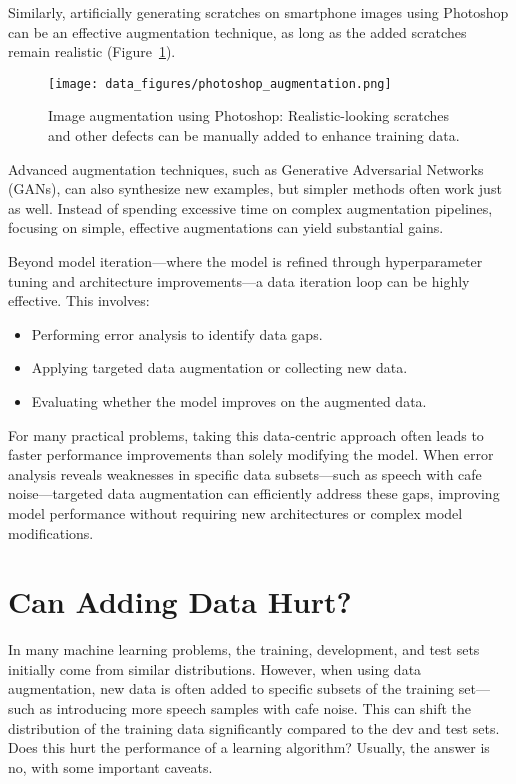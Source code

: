 \documentclass[12pt,openany]{book}
\begin{document}
Similarly, artificially generating scratches on smartphone images using Photoshop can be an effective augmentation technique, as long as the added scratches remain realistic (Figure~\ref{fig:photoshop_augmentation}).

\begin{figure}[H]
    \centering
    \texttt{[image: data\_figures/photoshop\_augmentation.png]}
    \caption{Image augmentation using Photoshop: Realistic-looking scratches and other defects can be manually added to enhance training data.}
    \label{fig:photoshop_augmentation}
\end{figure}

Advanced augmentation techniques, such as Generative Adversarial Networks (GANs), can also synthesize new examples, but simpler methods often work just as well. Instead of spending excessive time on complex augmentation pipelines, focusing on simple, effective augmentations can yield substantial gains.

Beyond model iteration—where the model is refined through hyperparameter tuning and architecture improvements—a data iteration loop can be highly effective. This involves:
\begin{itemize}
    \item Performing error analysis to identify data gaps.
    \item Applying targeted data augmentation or collecting new data.
    \item Evaluating whether the model improves on the augmented data.
\end{itemize}

For many practical problems, taking this data-centric approach often leads to faster performance improvements than solely modifying the model. When error analysis reveals weaknesses in specific data subsets—such as speech with cafe noise—targeted data augmentation can efficiently address these gaps, improving model performance without requiring new architectures or complex model modifications.



\section{Can Adding Data Hurt?}

In many machine learning problems, the training, development, and test sets initially come from similar distributions. However, when using data augmentation, new data is often added to specific subsets of the training set—such as introducing more speech samples with cafe noise. This can shift the distribution of the training data significantly compared to the dev and test sets. Does this hurt the performance of a learning algorithm? Usually, the answer is no, with some important caveats. \newline
\end{document}
